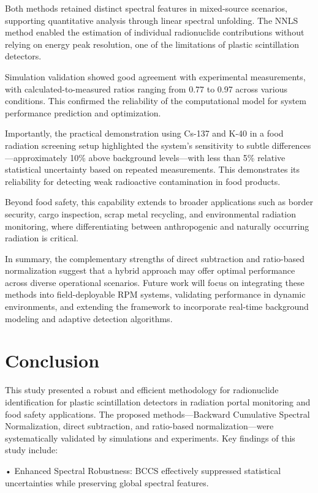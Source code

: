\documentclass[10pt]{wlscirep}
\begin{document}
Both methods retained distinct spectral features in mixed-source scenarios, supporting quantitative analysis through linear spectral unfolding. The NNLS method enabled the estimation of individual radionuclide contributions without relying on energy peak resolution, one of the limitations of plastic scintillation detectors.

Simulation validation showed good agreement with experimental measurements, with calculated-to-measured ratios ranging from 0.77 to 0.97 across various conditions. This confirmed the reliability of the computational model for system performance prediction and optimization.

Importantly, the practical demonstration using Cs-137 and K-40 in a food radiation screening setup highlighted the system's sensitivity to subtle differences—approximately 10\% above background levels—with less than 5\% relative statistical uncertainty based on repeated measurements. This demonstrates its reliability for detecting weak radioactive contamination in food products.

Beyond food safety, this capability extends to broader applications such as border security, cargo inspection, scrap metal recycling, and environmental radiation monitoring, where differentiating between anthropogenic and naturally occurring radiation is critical.

In summary, the complementary strengths of direct subtraction and ratio-based normalization suggest that a hybrid approach may offer optimal performance across diverse operational scenarios. Future work will focus on integrating these methods into field-deployable RPM systems, validating performance in dynamic environments, and extending the framework to incorporate real-time background modeling and adaptive detection algorithms.

\section*{Conclusion}

This study presented a robust and efficient methodology for radionuclide identification for plastic scintillation detectors in radiation portal monitoring and food safety applications. The proposed methods—Backward Cumulative Spectral Normalization, direct subtraction, and ratio-based normalization—were systematically validated by simulations and experiments. Key findings of this study include:

• Enhanced Spectral Robustness: BCCS effectively suppressed statistical uncertainties while preserving global spectral features.
\end{document}
